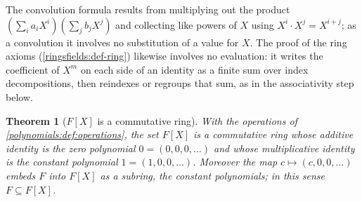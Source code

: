 \documentclass[11pt,a4paper]{article}
\newtheorem{theorem}{Theorem}[section]
\theoremstyle{definition}
\theoremstyle{remark}
\begin{document}
The convolution formula results from multiplying out the product
\((\sum_i a_i X^i)(\sum_j b_j X^j)\) and collecting like powers of \(X\)
using \(X^i \cdot X^j = X^{i+j}\); as a convolution it involves no
substitution of a value for \(X\). The proof of the ring axioms
(\cref{ringsfields:def-ring}) likewise involves no evaluation: it writes
the coefficient of \(X^m\) on each side of an identity as a finite sum
over index decompositions, then reindexes or regroups that sum, as in
the associativity step below.

\begin{theorem}[{\(F[X]\) is a commutative ring}]\label{polynomials:thm:ring}
With the operations of \cref{polynomials:def:operations}, the set
\(F[X]\) is a commutative ring whose additive identity is the zero
polynomial \(0 = (0,0,0,\dots)\) and whose multiplicative identity is the
constant polynomial \(1 = (1,0,0,\dots)\). Moreover the map
\(c \mapsto (c,0,0,\dots)\) embeds \(F\) into \(F[X]\) as a subring, the
\emph{constant polynomials}; in this sense \(F \subseteq F[X]\).
\end{theorem}
\end{document}
